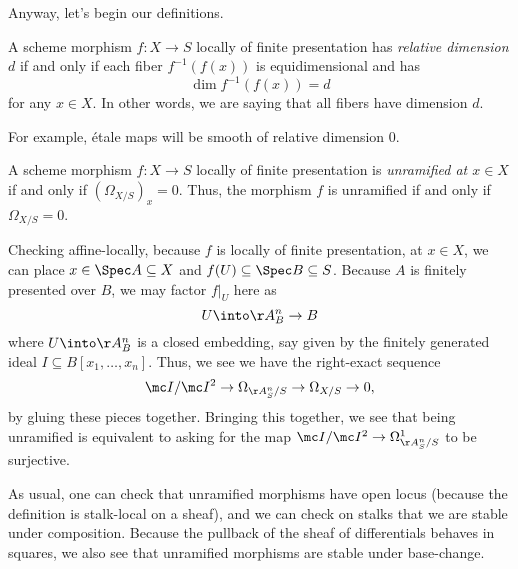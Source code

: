 \documentclass[../notes.tex]{subfiles}
\begin{document}
Anyway, let's begin our definitions.
\begin{definition}
	A scheme morphism $f\colon X\to S$ locally of finite presentation has \textit{relative dimension $d$} if and only if each fiber $f^{-1}(f(x))$ is equidimensional and has
	\[\dim f^{-1}(f(x))=d\]
	for any $x\in X$. In other words, we are saying that all fibers have dimension $d$.
\end{definition}
For example, \'etale maps will be smooth of relative dimension $0$.
\begin{definition}[unramified]
	A scheme morphism $f\colon X\to S$ locally of finite presentation is \textit{unramified at $x\in X$} if and only if $(\Omega_{X/S})_x=0$. Thus, the morphism $f$ is unramified if and only if $\Omega_{X/S}=0$.
\end{definition}
\begin{remark}
	Checking affine-locally, because $f$ is locally of finite presentation, at $x\in X$, we can place $x\in\Spec A\subseteq X$ and $f(U)\subseteq\Spec B\subseteq S$. Because $A$ is finitely presented over $B$, we may factor $f|_U$ here as
	\[U\into\AA^n_B\to B\]
	where $U\into\AA^n_B$ is a closed embedding, say given by the finitely generated ideal $I\subseteq B[x_1,\ldots,x_n]$. Thus, we see we have the right-exact sequence
	\[\mc I/\mc I^2\to\Omega_{\AA^n_S/S}\to\Omega_{X/S}\to0,\]
	by gluing these pieces together. Bringing this together, we see that being unramified is equivalent to asking for the map $\mc I/\mc I^2\to\Omega^1_{\AA^n_S/S}$ to be surjective.
\end{remark}
As usual, one can check that unramified morphisms have open locus (because the definition is stalk-local on a sheaf), and we can check on stalks that we are stable under composition. Because the pullback of the sheaf of differentials behaves in squares, we also see that unramified morphisms are stable under base-change.
\end{document}
